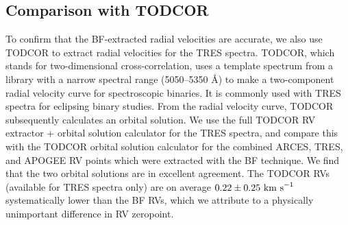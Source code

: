 \subsection{Comparison with TODCOR}\label{todcor}
To confirm that the BF-extracted radial velocities are accurate, we also use TODCOR \citep{zuc94} to extract radial velocities for the TRES spectra. TODCOR, which stands for two-dimensional cross-correlation, uses a template spectrum from a library with a narrow spectral range (5050--5350 \AA) to make a two-component radial velocity curve for spectroscopic binaries. It is commonly used with TRES spectra for eclipsing binary studies. From the radial velocity curve, TODCOR subsequently calculates an orbital solution. We use the full TODCOR RV extractor + orbital solution calculator for the TRES spectra, and compare this with the TODCOR orbital solution calculator for the combined ARCES, TRES, and APOGEE RV points which were extracted with the BF technique. We find that the two orbital solutions are in excellent agreement. The TODCOR RVs (available for TRES spectra only) are on average $0.22 \pm 0.25 \ \rm{km \ s}^{-1}$ systematically lower than the BF RVs, which we attribute to a physically unimportant difference in RV zeropoint.
 
  
  
  
  
  
  
  
  
  
  